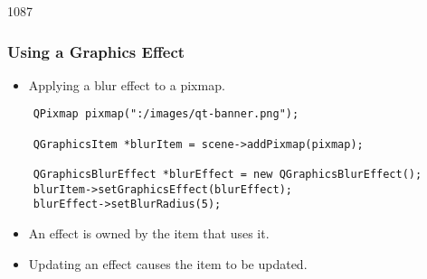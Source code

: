 \begin{slide}[fragile]{1087}\frametitle{Using a Graphics Effect}

\begin{itemize}
\item Applying a blur effect to a pixmap.
\end{itemize}

\begin{lstlisting}
    QPixmap pixmap(":/images/qt-banner.png");

    QGraphicsItem *blurItem = scene->addPixmap(pixmap);

    QGraphicsBlurEffect *blurEffect = new QGraphicsBlurEffect();
    blurItem->setGraphicsEffect(blurEffect);
    blurEffect->setBlurRadius(5);
\end{lstlisting}

\begin{itemize}
\item An effect is owned by the item that uses it.
\item Updating an effect causes the item to be updated.
\end{itemize}

\end{slide}

